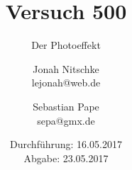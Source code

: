 

\title{Versuch 500}
\subtitle{Der Photoeffekt}
\author{Jonah Nitschke\\
        lejonah@web.de \and
        Sebastian Pape\\
        sepa@gmx.de}
\date{Durchführung: 16.05.2017\\
      Abgabe: 23.05.2017}



\maketitle
\newpage
\setcounter{page}{1}


\newpage


\newpage

\printbibliography


